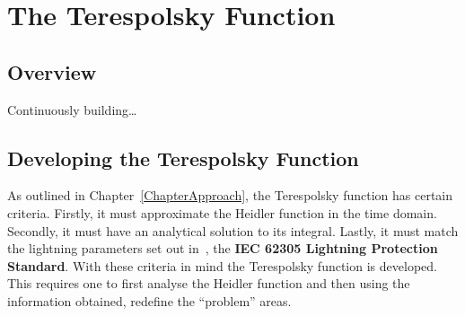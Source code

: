 
\chapter{The Terespolsky Function} %

\label{ChapterTeres} %

\begin{quote}
\end{quote}


\section{Overview}
\label{sec:overview}

Continuously building\ldots

\section{Developing the Terespolsky Function}
\label{sec:developing_the_}

As outlined in Chapter~\ref{ChapterApproach}, the Terespolsky function has certain criteria. Firstly, it must approximate the Heidler function in the time domain. Secondly, it must have an analytical solution to its integral. Lastly, it must match the lightning parameters set out in~\cite{IEC623051}, the \textbf{IEC 62305 Lightning Protection Standard}. With these criteria in mind the Terespolsky function is developed. This requires one to first analyse the Heidler function and then using the information obtained, redefine the ``problem'' areas.

